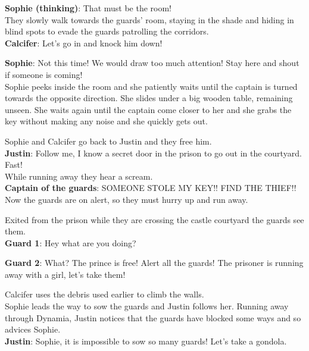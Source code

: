 \textbf{Sophie (thinking)}: That must be the room!\\

\noindent They slowly walk towards the guards’ room, staying in the shade and hiding in blind spots to evade the guards patrolling the corridors. \\

\textbf{Calcifer}: Let's go in and knock him down!

\textbf{Sophie}: Not this time! We would draw too much attention! Stay here and shout if someone is coming!\\

\noindent Sophie peeks inside the room and she patiently waits until the captain is turned towards the opposite direction. She slides under a big wooden table, remaining unseen. She waits again until the captain come closer to her and she grabs the key without making any noise and she quickly gets out.

\noindent Sophie and Calcifer go back to Justin and they free him.\\

\textbf{Justin}: Follow me, I know a secret door in the prison to go out in the courtyard. Fast! \\

\noindent While running away they hear a scream.\\

\textbf{Captain of the guards}: SOMEONE STOLE MY KEY!! FIND THE THIEF!!\\

\noindent Now the guards are on alert, so they must hurry up and run away.

\noindent Exited from the prison while they are crossing the castle courtyard the guards see them.\\

\textbf{Guard 1}: Hey what are you doing?

\textbf{Guard 2}: What? The prince is free! Alert all the guards! The prisoner is running away with a girl, let's take them!

\noindent Calcifer uses the debris used earlier to climb the walls.\\

\noindent Sophie leads the way to sow the guards and Justin follows her. Running away through Dynamia, Justin notices that the guards have blocked some ways and so advices Sophie.\\

\textbf{Justin}: Sophie, it is impossible to sow so many guards! Let's take a gondola. \\

